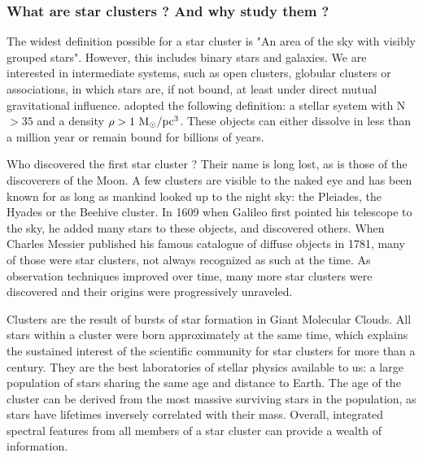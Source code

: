 \subsubsection*{What are star clusters ? And why study them ?}


The widest definition possible for a star cluster is "An area of the sky with visibly grouped stars". However, this includes binary stars and galaxies. We are interested in intermediate systems, such as open clusters, globular clusters or associations, in which stars are, if not bound, at least under direct mutual gravitational influence. \cite{Lada2003} adopted the following definition: a stellar system with N$>35$ and a density $\rho > 1~{\textrm{M}_\odot} /\textrm{pc}^3$. These objects can either dissolve in less than a million year or remain bound for billions of years.

Who discovered the first star cluster ? Their name is long lost, as is those of the discoverers of the Moon. A few clusters are visible to the naked eye and has been known for as long as mankind looked up to the night sky: the Pleiades, the Hyades or the Beehive cluster. In 1609 when Galileo first pointed his telescope to the sky, he added many stars to these objects, and discovered others. When Charles Messier published his famous catalogue of diffuse objects in 1781, many of those were star clusters, not always recognized as such at the time. As observation techniques improved over time, many more star clusters were discovered and their origins were progressively unraveled.

Clusters are the result of bursts of star formation in Giant Molecular Clouds. All stars within a cluster were born approximately at the same time, which explains the sustained interest of the scientific community for star clusters for more than a century. They are the best laboratories of stellar physics available to us: a large population of stars sharing the same age and distance to Earth. The age of the cluster can be derived from the most massive surviving stars in the population, as stars have lifetimes inversely correlated with their mass. Overall, integrated spectral features from all members of a star cluster can provide a wealth of information.

